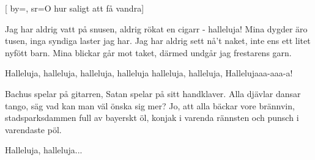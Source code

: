 


[ 	%
	by={},	%
	sr={O hur saligt att få vandra}]		%
	
\beginverse*		%
Jag har aldrig vatt på snusen,
aldrig rökat en cigarr - halleluja!
Mina dygder äro tusen,
inga syndiga laster jag har.
\endverse
\beginverse*
Jag har aldrig sett nå't naket,
inte ens ett litet nyfött barn.
Mina blickar går mot taket,
därmed undgår jag frestarens garn.
\endverse			%

\beginchorus
Halleluja, halleluja, 
halleluja, halleluja
halleluja, halleluja,
Hallelujaaa-aaa-a!
\endchorus

\beginverse*		%
Bachus spelar på gitarren,
Satan spelar på sitt handklaver.
Alla djävlar dansar tango,
säg vad kan man väl önska sig mer?
\endverse
\beginverse*
Jo, att alla bäckar vore brännvin,
stadsparksdammen full av bayerskt öl,
konjak i varenda rännsten
och punsch i varendaste pöl.
\endverse			%

\beginchorus
Halleluja, halleluja...
\endchorus
\endsong			%
